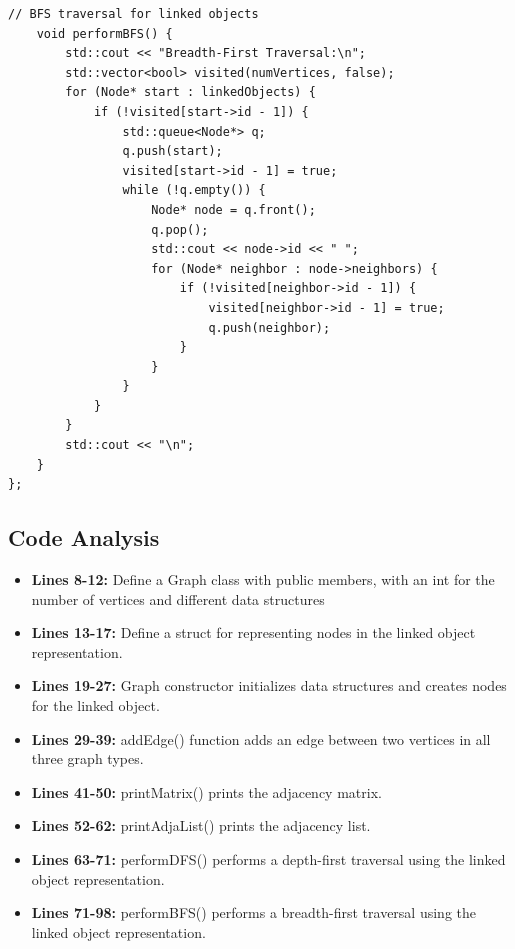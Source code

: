 \documentclass{article}
\begin{document}
\begin{lstlisting}[caption={Graph Implementation}]
    // BFS traversal for linked objects
    void performBFS() {
        std::cout << "Breadth-First Traversal:\n";
        std::vector<bool> visited(numVertices, false);
        for (Node* start : linkedObjects) {
            if (!visited[start->id - 1]) {
                std::queue<Node*> q;
                q.push(start);
                visited[start->id - 1] = true;
                while (!q.empty()) {
                    Node* node = q.front();
                    q.pop();
                    std::cout << node->id << " ";
                    for (Node* neighbor : node->neighbors) {
                        if (!visited[neighbor->id - 1]) {
                            visited[neighbor->id - 1] = true;
                            q.push(neighbor);
                        }
                    }
                }
            }
        }
        std::cout << "\n";
    }
};
\end{lstlisting}

\subsection{Code Analysis}
\begin{itemize}
    \item \textbf{Lines 8-12:} Define a Graph class with public members, with an int for the number of vertices and different data structures
    \item \textbf{Lines 13-17:} Define a struct for representing nodes in the linked object representation.
    \item \textbf{Lines 19-27:} Graph constructor initializes data structures and creates nodes for the linked object.
    \item \textbf{Lines 29-39:} addEdge() function adds an edge between two vertices in all three graph types.
    \item \textbf{Lines 41-50:} printMatrix() prints the adjacency matrix.
    \item \textbf{Lines 52-62:} printAdjaList() prints the adjacency list.
    \item \textbf{Lines 63-71:} performDFS() performs a depth-first traversal using the linked object representation.
    \item \textbf{Lines 71-98:} performBFS() performs a breadth-first traversal using the linked object representation.
\end{itemize}
\end{document}

